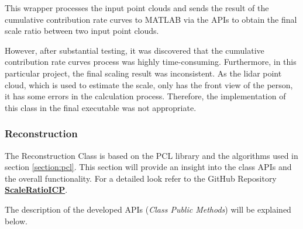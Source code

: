 \documentclass[12pt]{report}
\begin{document}
This wrapper processes the input point clouds and sends the result of the cumulative contribution rate curves to MATLAB via the APIs to obtain the final scale ratio between two input point clouds.

However, after substantial testing, it was discovered that the cumulative contribution rate curves process was highly time-consuming. Furthermore, in this particular project, the final scaling result was inconsistent. 
As the lidar point cloud, which is used to estimate the scale, only has the front view of the person, it has some errors in the calculation process. Therefore, the implementation of this class in the final executable was not appropriate.




\subsubsection{Reconstruction}
The Reconstruction Class is based on the PCL library and the algorithms used in section \ref{section:pcl}.
This section will provide an insight into the class APIs and the overall functionality. For a detailed look refer to the GitHub Repository \textbf{\href{https://github.com/linbaowei/ScaleRatioICP} {ScaleRatioICP}}.

The description of the developed APIs (\textit{Class Public Methods}) will be explained below.
\end{document}
